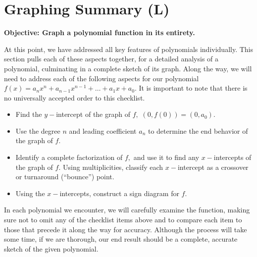 \documentclass[12pt]{book}
\theoremstyle{definition}
\begin{document}
\section{Graphing Summary (L)}
{\bf Objective: Graph a polynomial function in its entirety.}\par
At this point, we have addressed all key features of polynomials individually.  This section pulls each of these aspects together, for a detailed analysis of a polynomial, culminating in a complete sketch of its graph.  Along the way, we will need to address each of the following aspects for our polynomial $f(x)=a_nx^n+a_{n-1}x^{n-1}+\ldots+a_1x+a_0$.  It is important to note that there is no universally accepted order to this checklist.
\begin{itemize}
	\item Find the $y-$intercept of the graph of $f,$ $(0,f(0))=(0,a_0)$.
	\item Use the degree $n$ and leading coefficient $a_n$ to determine the end behavior of the graph of $f$.
	\item Identify a complete factorization of $f,$ and use it to find any $x-$intercepts of the graph of $f$.  Using multiplicities, classify each $x-$intercept as a crossover or turnaround (``bounce'') point.
	\item Using the $x-$intercepts, construct a sign diagram for $f$.
\end{itemize}
In each polynomial we encounter, we will carefully examine the function, making sure not to omit any of the checklist items above and to compare each item to those that precede it along the way for accuracy.  Although the process will take some time, if we are thorough, our end result should be a complete, accurate sketch of the given polynomial.\par
\end{document}
